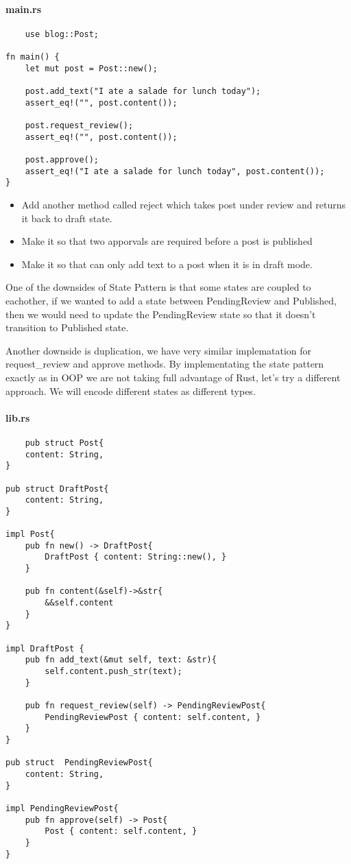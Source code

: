 \paragraph*{main.rs}\begin{lstlisting}
    use blog::Post;

fn main() {
    let mut post = Post::new();

    post.add_text("I ate a salade for lunch today");
    assert_eq!("", post.content());

    post.request_review();
    assert_eq!("", post.content());

    post.approve();
    assert_eq!("I ate a salade for lunch today", post.content());
}
\end{lstlisting}
\begin{exercise}
\begin{itemize}
    \item Add another method called reject which takes post under review and returns it back to draft state.
    \item Make it so that two apporvals are required before a post is published
    \item Make it so that can only add text to a post when it is in draft mode.
\end{itemize}
\end{exercise}

One of the downsides of State Pattern is that some states are coupled to eachother, if we wanted to add a state between PendingReview and Published, then we would need to update the PendingReview state so that it doesn't transition to Published state.

Another downside is duplication, we have very similar implematation for request\_review and approve methods. By implementating the state pattern exactly as in OOP we are not taking full advantage of Rust, let's try a different approach. We will encode different states as different types.

\paragraph*{lib.rs}\begin{lstlisting}
    pub struct Post{
    content: String,
}

pub struct DraftPost{
    content: String,
}

impl Post{
    pub fn new() -> DraftPost{
        DraftPost { content: String::new(), }
    }

    pub fn content(&self)->&str{
        &&self.content
    }
}

impl DraftPost {
    pub fn add_text(&mut self, text: &str){
        self.content.push_str(text);
    }

    pub fn request_review(self) -> PendingReviewPost{
        PendingReviewPost { content: self.content, }
    }
}

pub struct  PendingReviewPost{
    content: String,
}

impl PendingReviewPost{
    pub fn approve(self) -> Post{
        Post { content: self.content, }
    }
}
\end{lstlisting}

